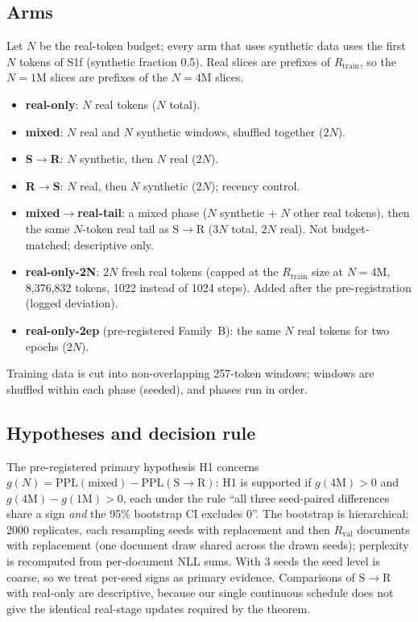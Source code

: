 \documentclass[conference]{IEEEtran}
\newcommand{\SR}{S$\to$R}
\newcommand{\RS}{R$\to$S}
\newcommand{\MRT}{mixed$\to$real-tail}
\begin{document}
\subsection{Arms}
Let $N$ be the real-token budget; every arm that uses synthetic data uses the first $N$ tokens of S1f (synthetic fraction 0.5). Real slices are prefixes of $R_{\text{train}}$, so the $N{=}1$M slices are prefixes of the $N{=}4$M slices.
\begin{itemize}
\item \textbf{real-only}: $N$ real tokens ($N$ total).
\item \textbf{mixed}: $N$ real and $N$ synthetic windows, shuffled together ($2N$).
\item \textbf{\SR}: $N$ synthetic, then $N$ real ($2N$).
\item \textbf{\RS}: $N$ real, then $N$ synthetic ($2N$); recency control.
\item \textbf{\MRT}: a mixed phase ($N$ synthetic + $N$ other real tokens), then the same $N$-token real tail as \SR{} ($3N$ total, $2N$ real). Not budget-matched; descriptive only.
\item \textbf{real-only-2N}: $2N$ fresh real tokens (capped at the $R_{\text{train}}$ size at $N{=}4$M, 8,376,832 tokens, 1022 instead of 1024 steps). Added after the pre-registration (logged deviation).
\item \textbf{real-only-2ep} (pre-registered Family~B): the same $N$ real tokens for two epochs ($2N$).
\end{itemize}
Training data is cut into non-overlapping 257-token windows; windows are shuffled within each phase (seeded), and phases run in order.

\subsection{Hypotheses and decision rule}
The pre-registered primary hypothesis H1 concerns $g(N)=\mathrm{PPL}(\text{mixed})-\mathrm{PPL}(\text{\SR})$: H1 is supported if $g(4\text{M})>0$ and $g(4\text{M})-g(1\text{M})>0$, each under the rule ``all three seed-paired differences share a sign \emph{and} the 95\% bootstrap CI excludes 0''. The bootstrap is hierarchical: 2000 replicates, each resampling seeds with replacement and then $R_{\text{val}}$ documents with replacement (one document draw shared across the drawn seeds); perplexity is recomputed from per-document NLL sums. With 3 seeds the seed level is coarse, so we treat per-seed signs as primary evidence. Comparisons of \SR{} with real-only are descriptive, because our single continuous schedule does not give the identical real-stage updates required by the theorem.
\end{document}
